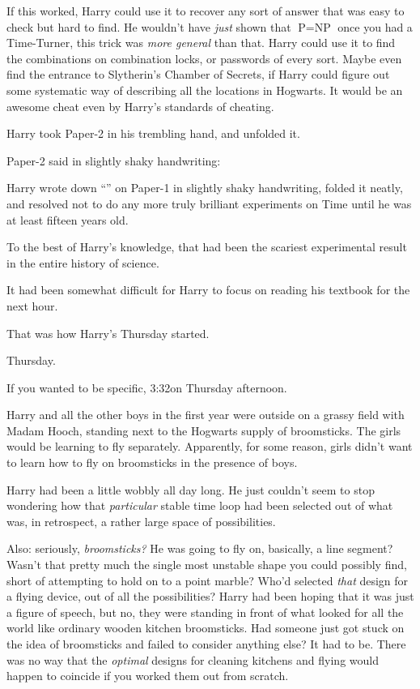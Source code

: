 If this worked, Harry could use it to recover any sort of answer that was easy to check but hard to find. He wouldn’t have \emph{just} shown that $\mbox{P}=\mbox{NP}$ once you had a Time-Turner, this trick was \emph{more general} than that. Harry could use it to find the combinations on combination locks, or passwords of every sort. Maybe even find the entrance to Slytherin’s Chamber of Secrets, if Harry could figure out some systematic way of describing all the locations in Hogwarts. It would be an awesome cheat even by Harry’s standards of cheating.

Harry took Paper-2 in his trembling hand, and unfolded it.

Paper-2 said in slightly shaky handwriting:


Harry wrote down “” on Paper-1 in slightly shaky handwriting, folded it neatly, and resolved not to do any more truly brilliant experiments on Time until he was at least fifteen years old.

To the best of Harry’s knowledge, that had been the scariest experimental result in the entire history of science.

It had been somewhat difficult for Harry to focus on reading his textbook for the next hour.

That was how Harry’s Thursday started.

\later

Thursday.

If you wanted to be specific, 3:32\pm on Thursday afternoon.

Harry and all the other boys in the first year were outside on a grassy field with Madam Hooch, standing next to the Hogwarts supply of broomsticks. The girls would be learning to fly separately. Apparently, for some reason, girls didn’t want to learn how to fly on broomsticks in the presence of boys.

Harry had been a little wobbly all day long. He just couldn’t seem to stop wondering how that \emph{particular} stable time loop had been selected out of what was, in retrospect, a rather large space of possibilities.

Also: seriously, \emph{broomsticks?} He was going to fly on, basically, a line segment? Wasn’t that pretty much the single most unstable shape you could possibly find, short of attempting to hold on to a point marble? Who’d selected \emph{that} design for a flying device, out of all the possibilities? Harry had been hoping that it was just a figure of speech, but no, they were standing in front of what looked for all the world like ordinary wooden kitchen broomsticks. Had someone just got stuck on the idea of broomsticks and failed to consider anything else? It had to be. There was no way that the \emph{optimal} designs for cleaning kitchens and flying would happen to coincide if you worked them out from scratch.

